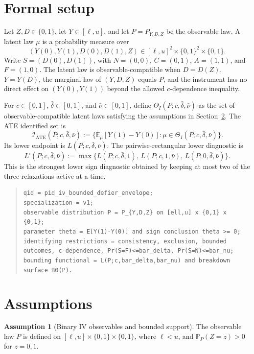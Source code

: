 \documentclass[11pt]{article}
\newcommand{\E}{\mathbb{E}}
\renewcommand{\Pr}{\mathbb{P}}
\theoremstyle{definition}
\newtheorem{assumption}{Assumption}
\theoremstyle{plain}
\theoremstyle{remark}
\begin{document}
\section{Formal setup}
Let \(Z,D\in\{0,1\}\), let \(Y\in[\ell,u]\), and let
\(P=P_{Y,D,Z}\) be the observable law.  A latent law \(\mu\) is a probability
measure over
\[
  (Y(0),Y(1),D(0),D(1),Z)
  \in [\ell,u]^2\times\{0,1\}^2\times\{0,1\}.
\]
Write \(S=(D(0),D(1))\), with \(N=(0,0)\), \(C=(0,1)\),
\(A=(1,1)\), and \(F=(1,0)\).  The latent law is observable-compatible when
\(D=D(Z)\), \(Y=Y(D)\), the marginal law of \((Y,D,Z)\) equals \(P\), and the
instrument has no direct effect on \((Y(0),Y(1))\) beyond the allowed
\(c\)-dependence inequality.

For \(c\in[0,1]\), \(\bar\delta\in[0,1]\), and
\(\bar\nu\in[0,1]\), define \(\Theta_I(P;c,\bar\delta,\bar\nu)\) as the set of
observable-compatible latent laws satisfying the assumptions in
Section~\ref{sec:assumptions}.  The ATE identified set is
\[
  \mathcal I_{\mathrm{ATE}}(P;c,\bar\delta,\bar\nu)
  :=\{\E_\mu[Y(1)-Y(0)]:\mu\in
  \Theta_I(P;c,\bar\delta,\bar\nu)\}.
\]
Its lower endpoint is \(L(P;c,\bar\delta,\bar\nu)\).  The pairwise-rectangular
lower diagnostic is
\[
L^\square(P;c,\bar\delta,\bar\nu)
:=\max\{L(P;c,\bar\delta,1),\,L(P;c,1,\bar\nu),\,
        L(P;0,\bar\delta,\bar\nu)\}.
\]
This is the strongest lower sign diagnostic obtained by keeping at most two of
the three relaxations active at a time.

\begin{quote}
\texttt{qid = pid\_iv\_bounded\_defier\_envelope;}\\
\texttt{specialization = v1;}\\
\texttt{observable distribution P = P\_\{Y,D,Z\} on [ell,u] x \{0,1\} x \{0,1\};}\\
\texttt{parameter theta = E[Y(1)-Y(0)] and sign conclusion theta >= 0;}\\
\texttt{identifying restrictions = consistency, exclusion, bounded outcomes, c-dependence, Pr(S=F)<=bar_delta, Pr(S=N)<=bar_nu;}\\
\texttt{bounding functional = L(P;c,bar\_delta,bar\_nu) and breakdown surface B0(P).}
\end{quote}

\section{Assumptions}\label{sec:assumptions}
\begin{assumption}[Binary IV observables and bounded support]\label{ass:observables}
The observable law \(P\) is defined on
\([\ell,u]\times\{0,1\}\times\{0,1\}\), where \(\ell<u\), and
\(\Pr_P(Z=z)>0\) for \(z=0,1\).
\end{assumption}
\end{document}
